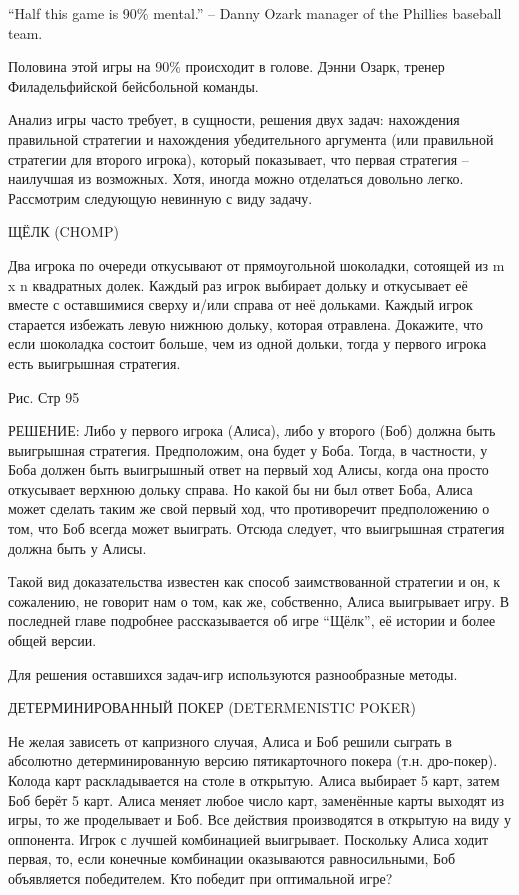  
“Half this game is 90\% mental.”
-- Danny Ozark manager of the Phillies baseball team.


Половина этой игры на 90\% происходит в голове.
   Дэнни Озарк, тренер Филадельфийской бейсбольной команды.




Анализ игры часто требует, в сущности, решения двух задач: нахождения правильной стратегии и нахождения убедительного аргумента (или правильной стратегии для второго игрока), который показывает, что первая стратегия -- наилучшая из возможных.
   Хотя, иногда можно отделаться довольно легко. Рассмотрим следующую невинную с виду задачу.


ЩЁЛК (CHOMP)


Два игрока по очереди откусывают от прямоугольной шоколадки, сотоящей из m x n  квадратных долек. Каждый раз игрок выбирает дольку и откусывает её вместе с оставшимися сверху и/или справа от неё дольками. Каждый игрок старается избежать левую нижнюю дольку, которая отравлена.
     Докажите, что если шоколадка состоит больше, чем из одной дольки, тогда у первого игрока есть выигрышная стратегия.


                        Рис. Стр 95


РЕШЕНИЕ: Либо у первого игрока (Алиса), либо у второго (Боб) должна быть выигрышная стратегия. Предположим, она будет у Боба. Тогда, в частности, у Боба должен быть выигрышный ответ на первый ход Алисы, когда она просто откусывает верхнюю дольку справа. 
   Но какой бы ни был ответ Боба, Алиса может сделать таким же свой первый ход, что противоречит предположению о том, что Боб всегда может выиграть. Отсюда следует,
что выигрышная стратегия должна быть у Алисы.


   Такой вид доказательства известен как способ заимствованной стратегии и он, к сожалению, не говорит нам о том, как же, собственно, Алиса выигрывает игру.
В последней главе подробнее рассказывается об игре “Щёлк”, её истории и более общей версии. 


  Для решения оставшихся задач-игр используются разнообразные методы.




ДЕТЕРМИНИРОВАННЫЙ ПОКЕР (DETERMENISTIC POKER)


Не желая зависеть от капризного случая, Алиса и Боб решили сыграть в абсолютно детерминированную версию пятикарточного покера (т.н. дро-покер). Колода карт раскладывается на столе в открытую. Алиса выбирает 5 карт, затем Боб берёт 5 карт.
Алиса меняет любое число карт, заменённые карты выходят из игры, то же проделывает и Боб. Все действия производятся в открытую на виду  у оппонента. Игрок с лучшей комбинацией выигрывает. Поскольку Алиса ходит первая, то, если конечные комбинации оказываются равносильными, Боб объявляется победителем. Кто победит при оптимальной игре?


